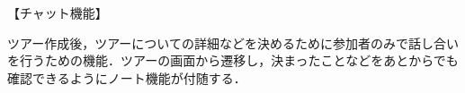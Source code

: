 【チャット機能】
\par
ツアー作成後，ツアーについての詳細などを決めるために参加者のみで話し合いを行うための機能．ツアーの画面から遷移し，決まったことなどをあとからでも確認できるようにノート機能が付随する．

